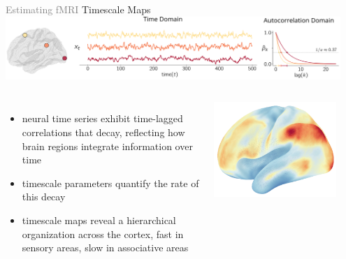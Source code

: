 \documentclass[8pt,aspectratio=169]{beamer}
\begin{document}
\begin{frame}{\textcolor{gray}{Estimating fMRI} Timescale Maps}
    \centering\includegraphics[width=0.95\textwidth]{docs/wnar/timescale.pdf}
    \vfill
    \begin{columns}
        \begin{itemize}
        \item neural time series exhibit time-lagged correlations that decay, reflecting how brain regions integrate information over time
        \item timescale parameters quantify the rate of this decay
        \item timescale maps reveal a hierarchical organization across the cortex, fast in sensory areas, slow in associative areas
    \end{itemize}
    \includegraphics[width=0.85\textwidth]{docs/wnar/timescale-brain.pdf}
    \end{columns}
\end{frame}
\end{document}
